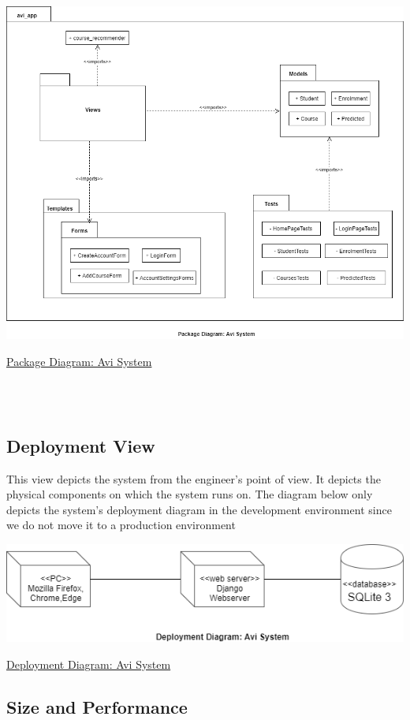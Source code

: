 \documentclass[10pt]{article}
\begin{document}
\begin{center}
\includegraphics[width=.9\textwidth]{package_diagram.png}
\end{center}
\caption{\underline{Package Diagram: Avi System}} \\ \\

\subsection{Deployment View}

This view depicts the system from the engineer’s point of view. It depicts the physical components on which the system runs on. The diagram below only depicts the system’s deployment diagram in the development environment since we do not move it to a production environment

\begin{center}
\includegraphics[width=.9\textwidth]{deployment_view.png}
\end{center}
\caption{\underline{Deployment Diagram: Avi System}}

\subsection{Size and Performance}
\end{document}
